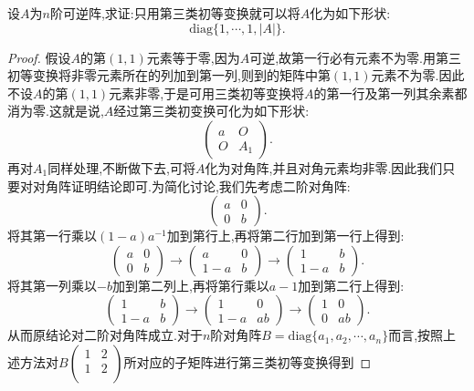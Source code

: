 \documentclass[../../main.tex]{subfiles}%
\begin{document}
\begin{example}\label{可逆阵都能只用第三类初等变换化为对角阵}
设\(A\)为\(n\)阶可逆阵,求证:只用第三类初等变换就可以将\(A\)化为如下形状:
\[
\mathrm{diag}\{1,\cdots,1,|A|\}.
\]
\end{example}
\begin{proof}
假设\(A\)的第\((1,1)\)元素等于零,因为\(A\)可逆,故第一行必有元素不为零.用第三初等变换将非零元素所在的列加到第一列,则到的矩阵中第\((1,1)\)元素不为零.因此不设\(A\)的第\((1,1)\)元素非零,于是可用三类初等变换将\(A\)的第一行及第一列其余素都消为零.这就是说,\(A\)经过第三类初变换可化为如下形状:
\[
\begin{pmatrix}
a & O \\
O & A_1
\end{pmatrix}.
\]
再对\(A_1\)同样处理,不断做下去,可将\(A\)化为对角阵,并且对角元素均非零.因此我们只要对对角阵证明结论即可.为简化讨论,我们先考虑二阶对角阵:
\[
\begin{pmatrix}
a & 0 \\
0 & b
\end{pmatrix}.
\]
将其第一行乘以\((1 - a)a^{-1}\)加到第行上,再将第二行加到第一行上得到:
\[
\begin{pmatrix}
a & 0 \\
0 & b
\end{pmatrix} \to
\begin{pmatrix}
a & 0 \\
1 - a & b
\end{pmatrix} \to
\begin{pmatrix}
1 & b \\
1 - a & b
\end{pmatrix}.
\]
将其第一列乘以\(-b\)加到第二列上,再将第行乘以\(a - 1\)加到第二行上得到:
\[
\begin{pmatrix}
1 & b \\
1 - a & b
\end{pmatrix} \to
\begin{pmatrix}
1 & 0 \\
1 - a & ab
\end{pmatrix} \to
\begin{pmatrix}
1 & 0 \\
0 & ab
\end{pmatrix}.
\]
从而原结论对二阶对角阵成立.对于$n$阶对角阵$B=\mathrm{diag}\{a_1,a_2,\cdots,a_n\}$而言,按照上述方法对$B\left( \begin{matrix}
1&		2\\
1&		2\\
\end{matrix} \right) $所对应的子矩阵进行第三类初等变换得到

\end{proof}
\end{document}
